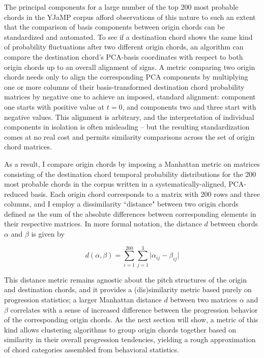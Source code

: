 The principal components for a large number of the top 200 most probable chords in the YJaMP corpus afford observations of this nature to such an extent that the comparison of basis components between origin chords can be standardized and automated.  To see if a destination chord shows the same kind of probability fluctuations after two different origin chords, an algorithm can compare the destination chord's PCA-basis coordinates with respect to both origin chords up to an overall alignment of signs.  A metric comparing two origin chords needs only to align the corresponding PCA components by multiplying one or more columns of their basis-transformed destination chord probability matrices by negative one to achieve an imposed, standard alignment: component one starts with positive value at $t=0$, and components two and three start with negative values.  This alignment is arbitrary, and the interpretation of individual components in isolation is often misleading -- but the resulting standardization comes at no real cost and permits similarity comparisons across the set of origin chord matrices.

As a result, I compare origin chords by imposing a Manhattan metric on matrices consisting of the destination chord temporal probability distributions for the 200 most probable chords in the corpus written in a systematically-aligned, PCA-reduced basis.  Each origin chord corresponds to a matrix with 200 rows and three columns, and I employ a dissimilarity ``distance" between two origin chords defined as the sum of the absolute differences between corresponding elements in their respective matrices.  In more formal notation, the distance $d$ between chords $\alpha$ and $\beta$ is given by

\begin{equation}
d(\alpha, \beta) = \sum_{i=1}^{200} \sum_{j=1}^3 \lvert \alpha_{ij} - \beta_{ij} \rvert
\end{equation}

This distance metric remains agnostic about the pitch structures of the origin and destination chords, and it provides a (dis)similarity metric based purely on progression statistics; a larger Manhattan distance $d$ between two matrices $\alpha$ and $\beta$ correlates with a sense of increased difference between the progression behavior of the corresponding origin chords. As the next section will show, a metric of this kind allows clustering algorithms to group origin chords together based on similarity in their overall progression tendencies, yielding a rough approximation of chord categories assembled from behavioral statistics.


